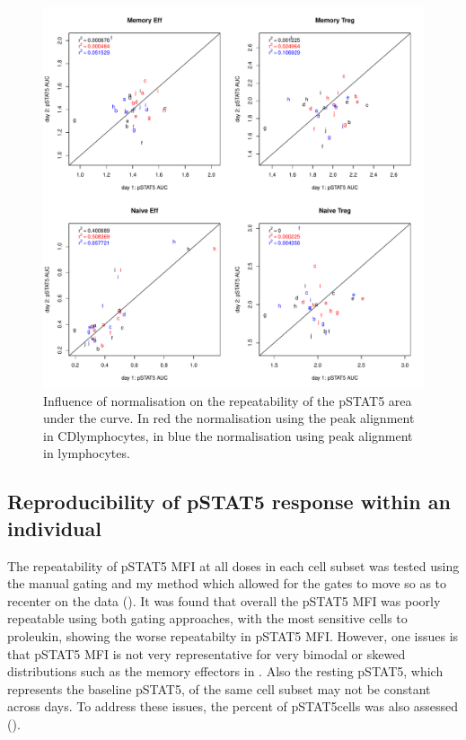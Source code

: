 \begin{figure}[h]
    \centering
    \includegraphics[scale=.5]{IL2/figures/pstat5-auc-repeatability-celltypes.pdf}
    { Influence of normalisation on the repeatability of the pSTAT5 area under the curve. }
    { In red the normalisation using the peak alignment in CD\positive lymphocytes, in blue the normalisation using peak alignment in lymphocytes. }
\end{figure}




\subsection{Reproducibility of pSTAT5 response within an individual}

The repeatability of pSTAT5 MFI at all doses in each cell subset was tested using the manual gating and my method which allowed for
the gates to move so as to recenter on the data ().
It was found that overall the pSTAT5 MFI was poorly repeatable using both gating approaches,
with the most sensitive cells to proleukin, showing the worse repeatabilty in pSTAT5 MFI.
However, one issues is that pSTAT5 MFI is not very representative for very bimodal or skewed distributions such
as the memory effectors in .
Also the resting pSTAT5, which represents the baseline pSTAT5, of the same cell subset may not be constant across days.  
To address these issues, the percent of pSTAT5\positive cells was also assessed ().

